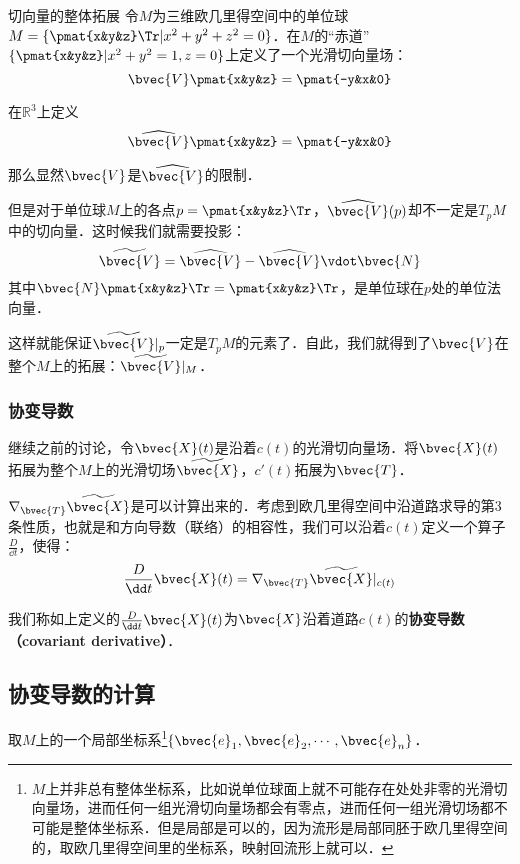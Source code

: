 \begin{example}{切向量的整体拓展}
令$M$为三维欧几里得空间中的单位球$M=\{\pmat{x&y&z}\Tr|x^2+y^2+z^2=0\}$．在$M$的“赤道”$\{\pmat{x&y&z}|x^2+y^2=1, z=0\}$上定义了一个光滑切向量场：
\begin{equation}
\bvec{V}\pmat{x&y&z}=\pmat{-y&x&0}
\end{equation}

在$\mathbb{R}^3$上定义
\begin{equation}
\widehat{\bvec{V}}\pmat{x&y&z}=\pmat{-y&x&0}
\end{equation}

那么显然$\bvec{V}$是$\widehat{\bvec{V}}$的限制．

但是对于单位球$M$上的各点$p=\pmat{x&y&z}\Tr$，$\widehat{\bvec{V}}(p)$却不一定是$T_pM$中的切向量．这时候我们就需要投影：
\begin{equation}
\widetilde{\bvec{V}}=\widehat{\bvec{V}}-\widehat{\bvec{V}}\vdot\bvec{N}
\end{equation}
其中$\bvec{N}\pmat{x&y&z}\Tr=\pmat{x&y&z}\Tr$，是单位球在$p$处的单位法向量．

这样就能保证$\widetilde{\bvec{V}}|_p$一定是$T_pM$的元素了．自此，我们就得到了$\bvec{V}$在整个$M$上的拓展：$\widetilde{\bvec{V}}|_{M}$．

\end{example}

\subsubsection{协变导数}

继续之前的讨论，令$\bvec{X}(t)$是沿着$c(t)$的光滑切向量场．将$\bvec{X}(t)$拓展为整个$M$上的光滑切场$\widetilde{\bvec{X}}$，$c'(t)$拓展为$\bvec{T}$．

$\nabla_{\bvec{T}}\widetilde{\bvec{X}}$是可以计算出来的．考虑到欧几里得空间中沿道路求导的第3条性质，也就是和方向导数（联络）的相容性，我们可以沿着$c(t)$定义一个算子$\frac{D}{\dd t}$，使得：
\begin{equation}
\frac{D}{\dd t}\bvec{X}(t)=\nabla_{\bvec{T}}\widetilde{\bvec{X}}|_{c(t)}
\end{equation}

我们称如上定义的$\frac{D}{\dd t}\bvec{X}(t)$为$\bvec{X}$沿着道路$c(t)$的\textbf{协变导数（covariant derivative）}．

\subsection{协变导数的计算}

取$M$上的一个局部坐标系\footnote{$M$上并非总有整体坐标系，比如说单位球面上就不可能存在处处非零的光滑切向量场，进而任何一组光滑切向量场都会有零点，进而任何一组光滑切场都不可能是整体坐标系．但是局部是可以的，因为流形是局部同胚于欧几里得空间的，取欧几里得空间里的坐标系，映射回流形上就可以．}$\{\bvec{e}_1, \bvec{e}_2, \cdots, \bvec{e}_n\}$．

















